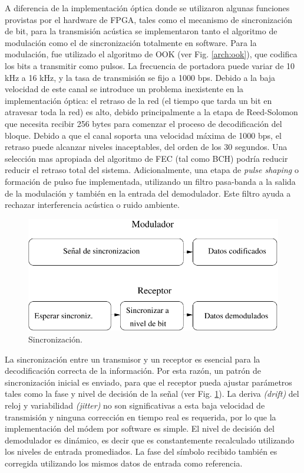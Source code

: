 A diferencia de la implementación óptica donde se utilizaron algunas funciones provistas por el hardware de FPGA, tales como el mecanismo de sincronización de bit, para la transmisión acústica se implementaron tanto el algoritmo de modulación como el de sincronización totalmente en software.
Para la modulación, fue utilizado el algoritmo de OOK (ver Fig. \ref{arch:ook}), que codifica los bits a transmitir como pulsos. La frecuencia de portadora puede variar de 10 kHz a 16 kHz, y la tasa de transmisión se fijo a 1000 bps. Debido a la baja velocidad de este canal se introduce un problema inexistente en la implementación óptica: el retraso de la red (el tiempo que tarda un bit en atravesar toda la red) es alto, debido principalmente a la etapa de Reed-Solomon que necesita recibir 256 bytes para comenzar el proceso de decodificación del bloque. Debido a que el canal soporta una velocidad máxima de 1000 bps, el retraso puede alcanzar niveles inaceptables, del orden de los 30 segundos.
Una selección mas apropiada del algoritmo de FEC (tal como BCH) podría reducir reducir el retraso total del sistema.
Adicionalmente, una etapa de \textit{pulse shaping} o formación de pulso fue implementada, utilizando un filtro pasa-banda a la salida de la modulación y también en la entrada del demodulador. Este filtro ayuda a rechazar interferencia acústica o ruido ambiente.

\begin{figure}[t]
  \centering
    \includegraphics[width=4.5in]{graphs/Audio-Sync2.pdf}
    \caption{Sincronización.}
    \label{arch:sync}
\end{figure}


La sincronización entre un transmisor y un receptor es esencial para la decodificación correcta de la información. Por esta razón, un patrón de sincronización inicial es enviado, para que el receptor pueda ajustar parámetros tales como la fase y nivel de decisión de la señal (ver Fig. \ref{arch:sync}). La deriva \textit{(drift)} del reloj y variabilidad \textit{(jitter)} no son significativas a esta baja velocidad de transmisión y ninguna corrección en tiempo real es requerida, por lo que la implementación del módem por software es simple.
El nivel de decisión del demodulador es dinámico, es decir que es constantemente recalculado utilizando los niveles de entrada promediados.
La fase del símbolo recibido también es corregida utilizando los mismos datos de entrada como referencia.

